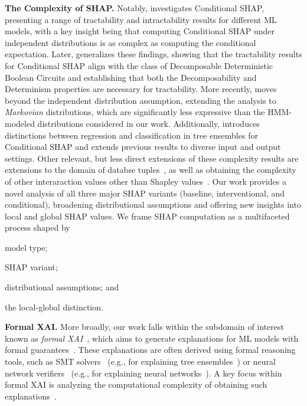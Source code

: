 \textbf{The Complexity of SHAP.} Notably, \citep{vander21} investigates Conditional SHAP, presenting a range of tractability and intractability results for different ML models, with a key insight being that computing Conditional SHAP under independent distributions is as complex as computing the conditional expectation. Later, \cite{arenas23} generalizes these findings, showing that the tractability results for Conditional SHAP align with the class of Decomposable Deterministic Boolean Circuits and establishing that both the Decomposability and Determinism properties are necessary for tractability. More recently, \cite{marzouk24a} moves beyond the independent distribution assumption, extending the analysis to \emph{Markovian} distributions, which are significantly less expressive than the HMM-modeled distributions considered in our work. Additionally, \cite{huangupdates} introduces distinctions between regression and classification in tree ensembles for Conditional SHAP and extends previous results to diverse input and output settings. Other relevant, but less direct extensions of these complexity results are extensions to the domain of databse tuples~\citep{deutch2022computing, livshits2021shapley, bertossi2023shapley, kara2024shapley, karmakar2024expected}, as well as obtaining the complexity of other interaraction values other than Shapley values~\citep{abramovich2024banzhaf, barcelo2025computation}. Our work provides a novel analysis of all three major SHAP variants (baseline, interventional, and conditional), broadening distributional assumptions and offering new insights into local and global SHAP values. We frame SHAP computation as a multifaceted process shaped by \begin{inparaenum}[(i)] \item model type; \item SHAP variant; \item distributional assumptions; and \item the local-global distinction.\end{inparaenum}

\textbf{Formal XAI.} More broadly, our work falls within the subdomain of interest known as \emph{formal XAI}~\citep{marques2023logic}, which aims to generate explanations for ML models with formal guarantees~\citep{ignatiev2020towards, bassan2023towards, darwiche2020reasons, darwiche2022computation, ignatiev2019abduction, audemard2022preferred}. These explanations are often derived using formal reasoning tools, such as SMT solvers~\citep{barrett2018satisfiability} (e.g., for explaining tree ensembles~\citep{audemard2022trading}) or neural network verifiers~\citep{katz2017reluplex, wu2024marabou, wang2021beta} (e.g., for explaining neural networks~\citep{izza2024distance, bassan2023formally}). A key focus within formal XAI is analyzing the computational complexity of obtaining such explanations~\citep{barcelo2020model, waldchen2021computational, cooper2023tractability, bassanlocal, blanc2021provably, amir2024hard, bass2025exp, adolfi2024computational, barcelo2025explaining, calautti2025complexity, ordyniak2023parameterized}. 




